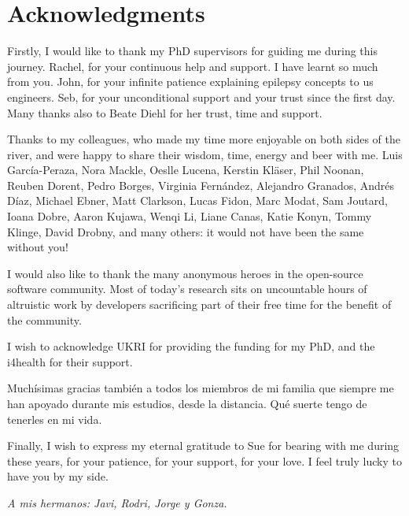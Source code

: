 \chapter{Acknowledgments}

Firstly, I would like to thank my PhD supervisors for guiding me during this journey.
Rachel, for your continuous help and support.
I have learnt so much from you.
John, for your infinite patience explaining epilepsy concepts to us engineers.
Seb, for your unconditional support and your trust since the first day.
Many thanks also to Beate Diehl for her trust, time and support.

Thanks to my colleagues, who made my time more enjoyable on both sides of the river, and were happy to share their wisdom, time, energy and beer with me.
Luis García-Peraza, Nora Mackle, Oeslle Lucena, Kerstin Kläser, Phil Noonan, Reuben Dorent, Pedro Borges, Virginia Fernández, Alejandro Granados, Andrés Díaz, Michael Ebner, Matt Clarkson, Lucas Fidon, Marc Modat, Sam Joutard, Ioana Dobre, Aaron Kujawa, Wenqi Li, Liane Canas, Katie Konyn, Tommy Klinge, David Drobny, and many others: it would not have been the same without you!

I would also like to thank the many anonymous heroes in the open-source software community.
Most of today's research sits on uncountable hours of altruistic work by developers sacrificing part of their free time for the benefit of the community.

I wish to acknowledge \ac{UKRI} for providing the funding for my PhD, and the \ac{i4health} for their support.

Muchísimas gracias también a todos los miembros de mi familia que siempre me han apoyado durante mis estudios, desde la distancia.
Qué suerte tengo de tenerles en mi vida.

Finally, I wish to express my eternal gratitude to Sue for bearing with me during these years, for your patience, for your support, for your love.
I feel truly lucky to have you by my side.

\clearpage
\begin{center}
    \raggedleft
    \vspace*{\fill}
    \textit{A mis hermanos: Javi, Rodri, Jorge y Gonza.}
    \vspace*{\fill}
\end{center}
\clearpage
